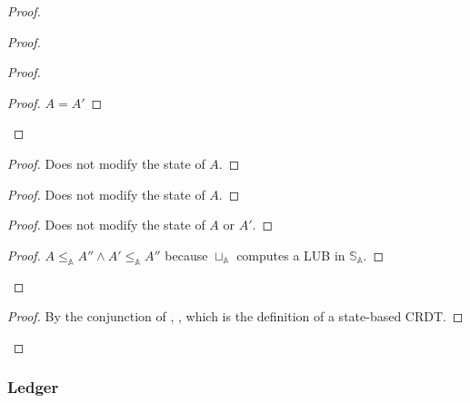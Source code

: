 \documentclass[9pt]{article}   	%
\begin{document}
\begin{proof}
\begin{proof}
\begin{proof}
			\begin{proof}
				$A=A'$
			\end{proof}
		\end{proof}
		
		\begin{proof}
			Does not modify the state of $A$.
		\end{proof}
		
		\begin{proof}
			Does not modify the state of $A$.
		\end{proof}
		
		\begin{proof}
			Does not modify the state of $A$ or $A'$.
		\end{proof}
		
		\begin{proof}
			$A \leq_\mathds{A} A'' \wedge A' \leq_\mathds{A} A''$ because $\sqcup_\mathds{A}$ computes a LUB in $\mathds{S}_\mathds{A}$.
		\end{proof}
	\end{proof}
	
	\qedstep
	\begin{proof}
		By the conjunction of , ,  which is the definition of a state-based CRDT.
	\end{proof}
\end{proof}


\subsubsection{Ledger}
\label{sec:proof:ledger}
\end{document}
